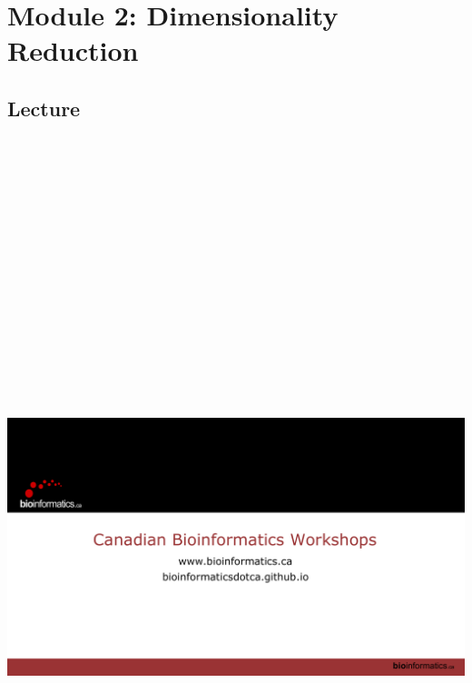 \documentclass[
]{book}
\begin{document}
\chapter{Module 2: Dimensionality Reduction}\label{module-2-dimensionality-reduction}

\section{Lecture}\label{lecture-1}

\includegraphics[width=1\textwidth,height=9.375in]{content-files/module-2-lecture.pdf}\\
\end{document}
